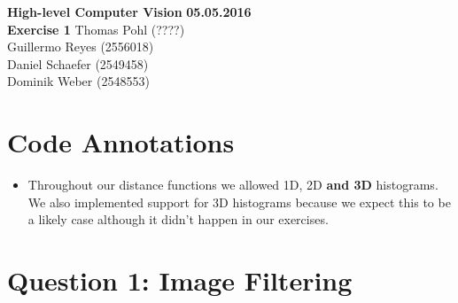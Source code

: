 \documentclass[12pt]{article}
\begin{document}

\noindent
{\Large \textbf{High-level Computer Vision}} \hfill \textbf{05.05.2016}\\
{\Large \textbf{Exercise 1}} \hfill Thomas Pohl (????)\\
\raggedleft \hfill Guillermo Reyes (2556018)\\
\hfill Daniel Schaefer (2549458)\\
\hfill Dominik Weber (2548553)\\

\raggedright


\section*{Code Annotations}

\begin{itemize}
    \item 
        Throughout our distance functions we allowed 1D, 2D \textbf{and 3D} histograms. We also implemented support for 3D histograms because we expect this to be a likely case although it didn't happen in our exercises.
\end{itemize}


\section*{Question 1: Image Filtering}
\end{document}
